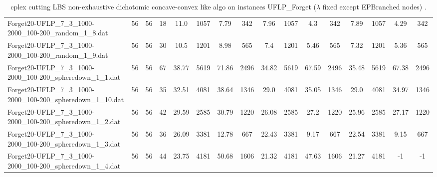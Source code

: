 \begin{sidewaystable}[!ht]
{\begin{tabular}{lccccccccccccccc}
Forget20-UFLP\_7\_3\_1000-2000\_100-200\_random\_1\_8.dat & 56 & 56 & 18 & 11.0 & 1057 & 7.79 & 342 & 7.96 & 1057 & 4.3 & 342 & 7.89 & 1057 & 4.29 & 342 \\
Forget20-UFLP\_7\_3\_1000-2000\_100-200\_random\_1\_9.dat & 56 & 56 & 30 & 10.5 & 1201 & 8.98 & 565 & 7.4 & 1201 & 5.46 & 565 & 7.32 & 1201 &  \textcolor{blue2}{5.36} & 565 \\
Forget20-UFLP\_7\_3\_1000-2000\_100-200\_spheredown\_1\_1.dat & 56 & 56 & 67 & 38.77 & 5619 & 71.86 & 2496 & 34.82 & 5619 & 67.59 & 2496 & 35.48 & 5619 & 67.38 & 2496 \\
Forget20-UFLP\_7\_3\_1000-2000\_100-200\_spheredown\_1\_10.dat & 56 & 56 & 35 & 32.51 & 4081 & 38.64 & 1346 & 29.0 & 4081 & 35.05 & 1346 & 29.0 & 4081 & 34.97 & 1346 \\
Forget20-UFLP\_7\_3\_1000-2000\_100-200\_spheredown\_1\_2.dat & 56 & 56 & 42 & 29.59 & 2585 & 30.79 & 1220 & 26.08 & 2585 & 27.2 & 1220 &  \textcolor{blue2}{25.96} & 2585 & 27.17 & 1220 \\
Forget20-UFLP\_7\_3\_1000-2000\_100-200\_spheredown\_1\_3.dat & 56 & 56 & 36 & 26.09 & 3381 & 12.78 & 667 & 22.43 & 3381 & 9.17 & 667 & 22.54 & 3381 & 9.15 & 667 \\
Forget20-UFLP\_7\_3\_1000-2000\_100-200\_spheredown\_1\_4.dat & 56 & 56 & 44 & 23.75 & 4181 & 50.68 & 1606 & 21.32 & 4181 & 47.63 & 1606 &  \textcolor{blue2}{21.27} & 4181 & -1 & -1 \\
\bottomrule
\end{tabular}
}%
\caption{cplex cutting LBS non-exhaustive dichotomic concave-convex like algo on instances UFLP_Forget ($\lambda$ fixed except EPBranched nodes) .}
\end{sidewaystable}
